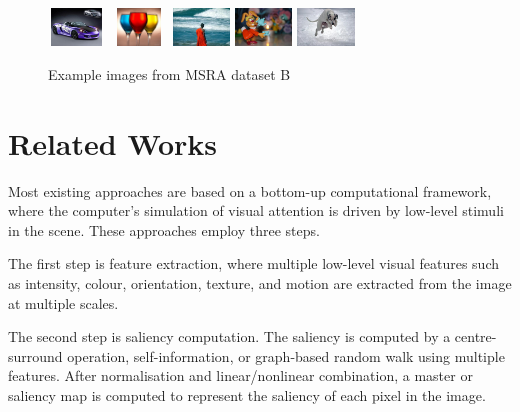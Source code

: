 \documentclass[10pt,twocolumn,letterpaper]{article}
\begin{document}
\begin{figure}
\begin{center}
    \includegraphics[width=0.6in,height=0.4in]{./Figures/example_image/4_142_142916.jpg}
    \includegraphics[width=0.6in,height=0.4in]{./Figures/example_image/4_143_143262.jpg}
    \includegraphics[width=0.6in,height=0.4in]{./Figures/example_image/4_144_144604.jpg}
    \includegraphics[width=0.6in,height=0.4in]{./Figures/example_image/4_134_134777.jpg}
    \includegraphics[width=0.6in,height=0.4in]{./Figures/example_image/4_134_134664.jpg}\\
    \caption{Example images from MSRA dataset B}
    \end{center}
\end{figure}

\section{Related Works}
Most existing approaches are based on a bottom-up computational framework, where the computer's simulation of visual attention is driven by low-level stimuli in the scene.  %
These approaches employ three steps.

The first step is feature extraction, where multiple low-level visual features such as intensity, colour, orientation, texture, and motion are extracted from the image at multiple scales.

The second step is saliency computation. The saliency is computed by a centre-surround operation, self-information, or graph-based random walk using multiple features. After normalisation and linear/nonlinear combination, a master or saliency map is computed to represent the saliency of each pixel in the image. 
\end{document}

